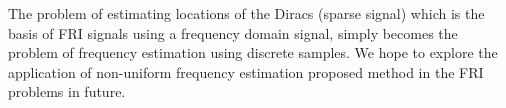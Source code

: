 \documentclass{UCF_ETD}
\begin{document}
%
%
The problem of estimating locations of the Diracs (sparse signal) which is the basis of FRI signals  using a frequency domain signal, simply becomes the problem of frequency estimation using discrete samples. We hope to explore the application of non-uniform frequency estimation proposed method in the FRI problems in future.
\end{document}
